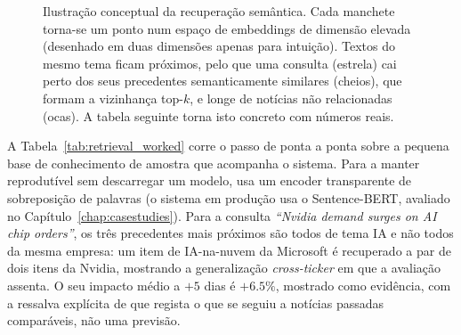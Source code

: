 \begin{figure}[ht]
\centering
{}
\caption[Ilustração conceptual da recuperação semântica]{Ilustração conceptual da recuperação semântica.
Cada manchete torna-se um ponto num espaço de embeddings de dimensão elevada (desenhado em duas dimensões
apenas para intuição). Textos do mesmo tema ficam próximos, pelo que uma consulta (estrela) cai perto dos
seus precedentes semanticamente similares (cheios), que formam a vizinhança top-$k$, e longe de notícias não
relacionadas (ocas). A tabela seguinte torna isto concreto com números reais.}
\label{fig:embedding_concept}
\end{figure}

A Tabela~\ref{tab:retrieval_worked} corre o passo de ponta a ponta sobre a pequena base de conhecimento de
amostra que acompanha o sistema. Para a manter reprodutível sem descarregar um modelo, usa um encoder
transparente de sobreposição de palavras (o sistema em produção usa o Sentence-BERT, avaliado no
Capítulo~\ref{chap:casestudies}). Para a consulta \emph{``Nvidia demand surges on AI chip orders''}, os três
precedentes mais próximos são todos de tema IA e não todos da mesma empresa: um item de IA-na-nuvem da
Microsoft é recuperado a par de dois itens da Nvidia, mostrando a generalização \emph{cross-ticker} em que a
avaliação assenta. O seu impacto médio a $+5$ dias é $+6.5\%$, mostrado como evidência, com a ressalva
explícita de que regista o que se seguiu a notícias passadas comparáveis, não uma previsão.

